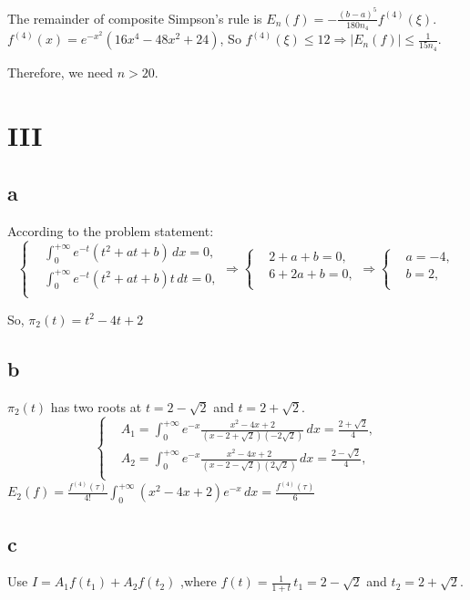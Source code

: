 \documentclass[a4paper]{article}
\begin{document}
The remainder of composite Simpson's rule is $E_{n}(f) = - \frac{(b-a)^{5}}{180n_{4}}f^{(4)}(\xi)$.
$f^{(4)}(x) = e^{-x^{2}}(16x^{4} - 48x^{2} + 24)$, So $f^{(4)}(\xi) \leq 12 \Rightarrow \left\lvert E_{n}(f)\right\rvert  \leq \frac{1}{15n_{4}}$.

Therefore, we need $n>20$.

\section*{III}
\subsection*{a}
According to the problem statement:
$$
\left\{
\begin{array}{rl}
&\int_{0}^{+\infty} e^{-t}(t^{2}+at+b) \,dx = 0 ,\\
&\int_{0}^{+\infty} e^{-t}(t^{2}+at+b)t \,dt = 0 ,\\
\end{array}
\right.
\Rightarrow 
\left\{
\begin{array}{rl}
&2 + a + b = 0 ,\\
&6 + 2a + b = 0 ,\\
\end{array}
\right.
\Rightarrow 
\left\{
\begin{array}{rl}
&a = -4 ,\\
&b = 2 ,\\
\end{array}
\right.
$$

So, $\pi_{2}(t) = t^{2} - 4t + 2$


\subsection*{b}
$\pi_{2}(t)$ has two roots at $t = 2-\sqrt{2}$ and $t = 2 + \sqrt{2}$.
$$
\left\{
\begin{array}{rl}
&A_{1} = \int_{0}^{+\infty} e^{-x}\frac{x^{2} - 4x + 2}{(x -2+\sqrt{2})(-2\sqrt{2})} \,dx = \frac{2+\sqrt{2}}{4} ,\\
&A_{2} = \int_{0}^{+\infty} e^{-x}\frac{x^{2} - 4x + 2}{(x -2-\sqrt{2})(2\sqrt{2})} \,dx = \frac{2-\sqrt{2}}{4} ,\\
\end{array}
\right.
$$
$E_{2}(f) = \frac{f^{(4)}(\tau)}{4!}\int_{0}^{+\infty} (x^{2} - 4x + 2)e^{-x} \,dx = \frac{f^{(4)}(\tau)}{6}$


\subsection*{c}
Use $I = A_{1}f(t_{1}) + A_{2}f(t_{2})$ ,where $f(t) = \frac{1}{1+t}\, t_{1} = 2-\sqrt{2}$ and $t_{2} = 2+\sqrt{2}$.
\end{document}
